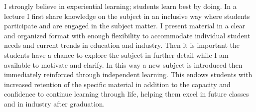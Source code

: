 
\begin{minipage}[t]{\textwidth} %
	\vspace{-\baselineskip} %
I strongly believe in experiential learning; students learn best by doing. In a lecture I first share
knowledge on the subject in an inclusive way where students participate and are engaged in the
subject matter. I present material in a clear and organized format with enough flexibility to
accommodate individual student needs and current trends in education and industry. Then it is
important the students have a chance to explore the subject in further detail while I am available
to motivate and clarify. In this way a new subject is introduced then immediately reinforced
through independent learning. This endows students with increased retention of the specific
material in addition to the capacity and confidence to continue learning through life, helping
them excel in future classes and in industry after graduation.

\end{minipage}


